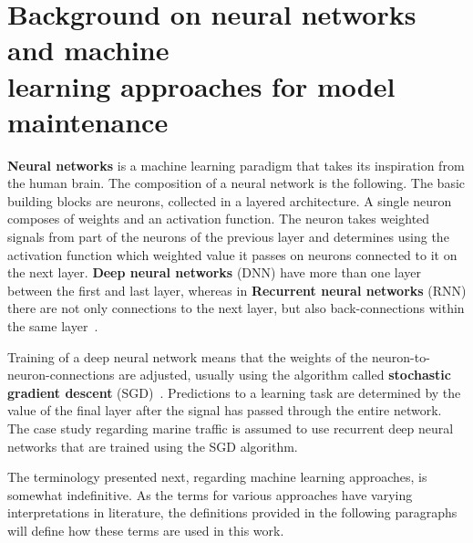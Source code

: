 \section[Background on neural networks and machine learning approaches for model maintenance]{Background on neural networks and machine\\ learning approaches for model maintenance}

\textbf{Neural networks} is a machine learning paradigm that takes its inspiration from the human brain. The composition of a neural network is the following. The basic building blocks are neurons, collected in a layered architecture. A single neuron composes of weights and an activation function. The neuron takes weighted signals from part of the neurons of the previous layer and determines using the activation function which weighted value it passes on neurons connected to it on the next layer. \textbf{Deep neural networks} (DNN) have more than one layer between the first and last layer, whereas in \textbf{Recurrent neural networks} (RNN) there are not only connections to the next layer, but also back-connections within the same layer~\cite{ben-nunDemystifyingParallelDistributed2019}. 

 Training of a deep neural network means that the weights of the neuron-to-neuron-connections are adjusted, usually using the algorithm called \textbf{stochastic gradient descent} (SGD)~\cite{ben-nunDemystifyingParallelDistributed2019}. Predictions to a learning task are determined by the value of the final layer after the signal has passed through the entire network. The case study regarding marine traffic is assumed to use recurrent deep neural networks that are trained using the SGD algorithm.

The terminology presented next, regarding machine learning approaches, is somewhat indefinitive. As the terms for various approaches have varying interpretations in literature, the definitions provided in the following paragraphs will define how these terms are used in this work.

